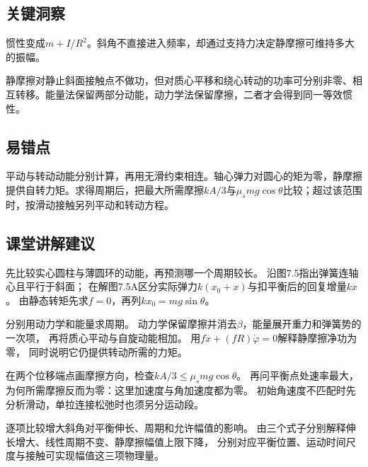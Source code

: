 \documentclass[UTF8,fontset=fandol,a4paper,11pt]{ctexart}
\begin{document}


\subsection*{关键洞察}

惯性变成\(m+I/R^2\)。斜角不直接进入频率，却通过支持力决定静摩擦可维持多大的振幅。

静摩擦对静止斜面接触点不做功，但对质心平移和绕心转动的功率可分别非零、相互转移。能量法保留两部分动能，动力学法保留摩擦，二者才会得到同一等效惯性。




\subsection*{易错点}

平动与转动动能分别计算，再用无滑约束相连。轴心弹力对圆心的矩为零，静摩擦提供自转力矩。求得周期后，把最大所需摩擦$kA/3$与$\mu_smg\cos\theta$比较；超过该范围时，按滑动接触另列平动和转动方程。




\subsection*{课堂讲解建议}

先比较实心圆柱与薄圆环的动能，再预测哪一个周期较长。
沿图7.5指出弹簧连轴心且平行于斜面；
在解图7.5A区分实际弹力$k(x_0+x)$与扣平衡后的回复增量$kx$。
由静态转矩先求$f=0$，再列$kx_0=mg\sin\theta$。

分别用动力学和能量求周期。
动力学保留摩擦并消去$\beta$，能量展开重力和弹簧势的一次项，
再将质心平动与自旋动能相加。
用$f\dot x+(fR)\dot\varphi=0$解释静摩擦净功为零，
同时说明它仍提供转动所需的力矩。

在两个位移端点画摩擦方向，检查$kA/3\leq\mu_smg\cos\theta$。
再问平衡点处速率最大，为何所需摩擦反而为零：这里加速度与角加速度都为零。
初始角速度不匹配时先分析滑动，单拉连接松弛时也须另分运动段。

逐项比较增大斜角对平衡伸长、周期和允许幅值的影响。
由三个式子分别解释伸长增大、线性周期不变、静摩擦幅值上限下降，
分别对应平衡位置、运动时间尺度与接触可实现幅值这三项物理量。


\end{document}
